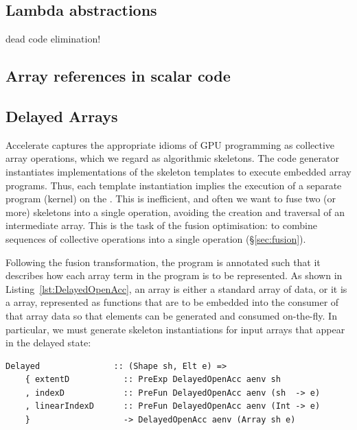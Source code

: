 \subsection{Lambda abstractions}

dead code elimination!


\subsection{Array references in scalar code}

\subsection{Delayed Arrays}

Accelerate captures the appropriate idioms of GPU programming as collective
array operations, which we regard as algorithmic skeletons. The code generator
instantiates \CUDA implementations of the skeleton templates to execute
embedded array programs. Thus, each template instantiation implies the execution
of a separate program (kernel) on the \GPU@. This is inefficient, and often we
want to fuse two (or more) skeletons into a single operation, avoiding the
creation and traversal of an intermediate array. This is the task of the fusion
optimisation: to combine sequences of collective operations into a single
operation (\S\ref{sec:fusion}).

Following the fusion transformation, the program \AST is annotated such that it
describes how each array term in the program is to be represented. As shown in
Listing~\ref{lst:DelayedOpenAcc}, an array is either a standard array of
 data, or it is a  array, represented as functions
that are to be embedded into the consumer of that array data so that elements
can be generated and consumed on-the-fly. In particular, we must generate
skeleton instantiations for input arrays that appear in the delayed state:

\begin{lstlisting}[style=haskell]
  Delayed               :: (Shape sh, Elt e) =>
    { extentD           :: PreExp DelayedOpenAcc aenv sh
    , indexD            :: PreFun DelayedOpenAcc aenv (sh  -> e)
    , linearIndexD      :: PreFun DelayedOpenAcc aenv (Int -> e)
    }                   -> DelayedOpenAcc aenv (Array sh e)
\end{lstlisting}

\endinput

Our code generator is also amenable to generating code that
results from fusing networks of skeletons, which we describe
separately~\cite{McDonell:acc-optim}. Instead of a manifest array of raw data,
following the fusion by the frontend the @map@ operation instead takes a
description of how to generate input array data. In
Listing~\ref{lst:map_skeleton}, the expression @get ix@ splices into the
skeleton the code necessary to produce the value from the input arrays at index
@ix@, and assigns that value to the local variable @x@.


